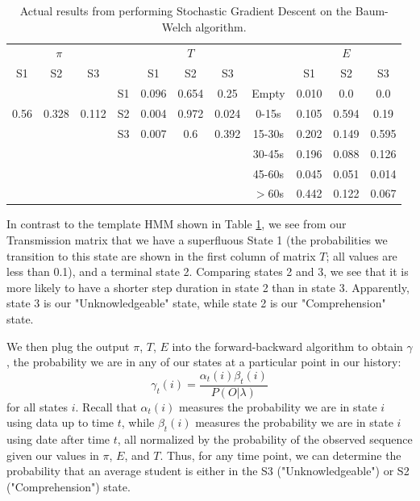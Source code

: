 \documentclass{article} %
\begin{document}
\begin{table}[t]
\begin{center}
\begin{tabular}{ccc|c|ccc|c|ccc}
\multicolumn{3}{c}{$\pi$} && \multicolumn{3}{c}{$T$} && \multicolumn{3}{c}{$E$}\\
S1 & S2 & S3 & & S1 & S2 & S3 && S1 & S2 & S3\\
& & & S1 & 0.096 & 0.654 & 0.25  &Empty & 0.010 & 0.0 & 0.0\\
0.56 & 0.328 & 0.112 & S2 & 0.004 & 0.972 & 0.024 &0-15s& 0.105 & 0.594 & 0.19\\
&&& S3 & 0.007 & 0.6 & 0.392 &15-30s& 0.202 & 0.149 & 0.595\\
&&&&&&&30-45s & 0.196 & 0.088 & 0.126\\
&&&&&&&45-60s & 0.045 & 0.051 & 0.014\\
&&&&&&&$>$60s& 0.442 & 0.122 & 0.067\\
\end{tabular}
\caption{Actual results from performing Stochastic Gradient Descent on the Baum-Welch algorithm.}\label{HMMprop}
\end{center}
\end{table}

In contrast to the template HMM shown in Table \ref{HMMprop}, we see from our Transmission matrix that we have a superfluous State 1 (the probabilities we transition to this state are shown in the first column of matrix $T$; all values are less than 0.1), and a terminal state 2. Comparing states 2 and 3, we see that it is more likely to have a shorter step duration in state 2 than in state 3. Apparently, state 3 is our "Unknowledgeable" state, while state 2 is our "Comprehension" state.

We then plug the output $\pi$, $T$, $E$ into the forward-backward algorithm to obtain $\gamma$, the probability we are in any of our states at a particular point in our history:
\begin{equation}
\gamma_t(i) = \frac{\alpha_t(i)\beta_t(i)}{P(O|\lambda)}\label{gamma}
\end{equation}
for all states $i$. Recall that $\alpha_t(i)$ measures the probability we are in state $i$ using data up to time $t$, while $\beta_t(i)$ measures the probability we are in state $i$ using date after time $t$, all normalized by the probability of the observed sequence given our values in $\pi$, $E$, and $T$. Thus, for any time point, we can determine the probability that an average student is either in the S3 ("Unknowledgeable") or S2 ("Comprehension") state.
\end{document}
